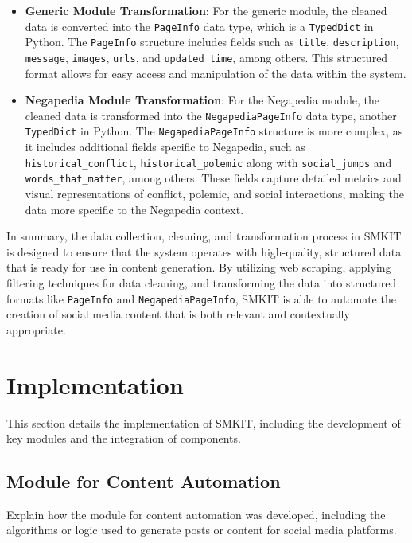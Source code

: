 \begin{itemize}
    \item \textbf{Generic Module Transformation}: For the generic module, the cleaned data is converted into the \texttt{PageInfo} data type, which is a \texttt{TypedDict} in Python. The \texttt{PageInfo} structure includes fields such as \texttt{title}, \texttt{description}, \texttt{message}, \texttt{images}, \texttt{urls}, and \texttt{updated\_time}, among others. This structured format allows for easy access and manipulation of the data within the system.
    \item \textbf{Negapedia Module Transformation}: For the Negapedia module, the cleaned data is transformed into the \texttt{NegapediaPageInfo} data type, another \texttt{TypedDict} in Python. The \texttt{NegapediaPageInfo} structure is more complex, as it includes additional fields specific to Negapedia, such as \texttt{historical\_conflict}, \texttt{historical\_polemic} along with \texttt{social\_jumps} and \texttt{words\_that\_matter}, among others. These fields capture detailed metrics and visual representations of conflict, polemic, and social interactions, making the data more specific to the Negapedia context.
\end{itemize}

In summary, the data collection, cleaning, and transformation process in SMKIT is designed to ensure that the system operates with high-quality, structured data that is ready for use in content generation. By utilizing web scraping, applying filtering techniques for data cleaning, and transforming the data into structured formats like \texttt{PageInfo} and \texttt{NegapediaPageInfo}, SMKIT is able to automate the creation of social media content that is both relevant and contextually appropriate.

\section{Implementation}
\label{sec:implementation}
This section details the implementation of SMKIT, including the development of key modules and the integration of components.

\subsection{Module for Content Automation}
\label{subsec:module_for_content_automation}
Explain how the module for content automation was developed, including the algorithms or logic used to generate posts or content for social media platforms.

